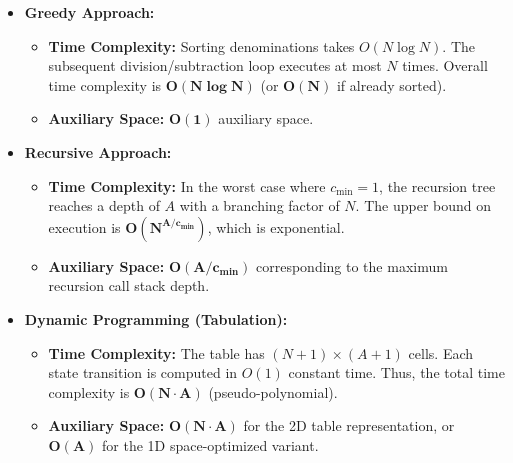 \documentclass[12pt]{article}
\begin{document}
\begin{itemize}
    \item \textbf{Greedy Approach:}
    \begin{itemize}
        \item \textbf{Time Complexity:} Sorting denominations takes $O(N \log N)$. The subsequent division/subtraction loop executes at most $N$ times. Overall time complexity is $\mathbf{O(N \log N)}$ (or $\mathbf{O(N)}$ if already sorted).
        \item \textbf{Auxiliary Space:} $\mathbf{O(1)}$ auxiliary space.
    \end{itemize}

    \item \textbf{Recursive Approach:}
    \begin{itemize}
        \item \textbf{Time Complexity:} In the worst case where $c_{\min} = 1$, the recursion tree reaches a depth of $A$ with a branching factor of $N$. The upper bound on execution is $\mathbf{O(N^{A / c_{\min}})}$, which is exponential.
        \item \textbf{Auxiliary Space:} $\mathbf{O(A / c_{\min})}$ corresponding to the maximum recursion call stack depth.
    \end{itemize}

    \item \textbf{Dynamic Programming (Tabulation):}
    \begin{itemize}
        \item \textbf{Time Complexity:} The table has $(N+1) \times (A+1)$ cells. Each state transition is computed in $O(1)$ constant time. Thus, the total time complexity is $\mathbf{O(N \cdot A)}$ (pseudo-polynomial).
        \item \textbf{Auxiliary Space:} $\mathbf{O(N \cdot A)}$ for the 2D table representation, or $\mathbf{O(A)}$ for the 1D space-optimized variant.
    \end{itemize}
\end{itemize}

\begin{table}[H]
\centering
{}
\caption{Comprehensive Comparison of Coin Change Solvers}
\end{table}
\end{document}

